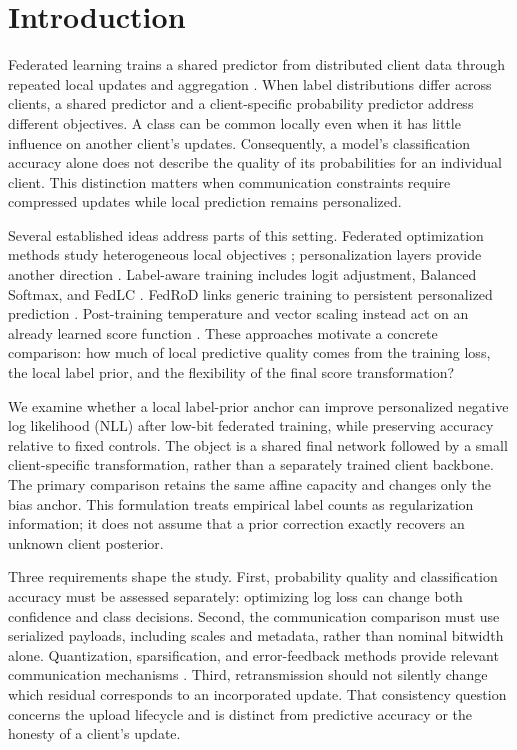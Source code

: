 \section{Introduction}

Federated learning trains a shared predictor from distributed client data through repeated local updates and aggregation \cite{mcmahan2017fedavg}. When label distributions differ across clients, a shared predictor and a client-specific probability predictor address different objectives. A class can be common locally even when it has little influence on another client's updates. Consequently, a model's classification accuracy alone does not describe the quality of its probabilities for an individual client. This distinction matters when communication constraints require compressed updates while local prediction remains personalized.

Several established ideas address parts of this setting. Federated optimization methods study heterogeneous local objectives \cite{li2020fedprox,karimireddy2020scaffold,wang2020fednova}; personalization layers provide another direction \cite{arivazhagan2019fedper}. Label-aware training includes logit adjustment, Balanced Softmax, and FedLC \cite{menon2021logitadjust,ren2020balanced,zhang2022fedlc}. FedRoD links generic training to persistent personalized prediction \cite{chen2022fedrod}. Post-training temperature and vector scaling instead act on an already learned score function \cite{guo2017calibration,alexandari2020labelshift}. These approaches motivate a concrete comparison: how much of local predictive quality comes from the training loss, the local label prior, and the flexibility of the final score transformation?

We examine whether a local label-prior anchor can improve personalized negative log likelihood (NLL) after low-bit federated training, while preserving accuracy relative to fixed controls. The object is a shared final network followed by a small client-specific transformation, rather than a separately trained client backbone. The primary comparison retains the same affine capacity and changes only the bias anchor. This formulation treats empirical label counts as regularization information; it does not assume that a prior correction exactly recovers an unknown client posterior.

Three requirements shape the study. First, probability quality and classification accuracy must be assessed separately: optimizing log loss can change both confidence and class decisions. Second, the communication comparison must use serialized payloads, including scales and metadata, rather than nominal bitwidth alone. Quantization, sparsification, and error-feedback methods provide relevant communication mechanisms \cite{alistarh2017qsgd,stich2018sparsified,karimireddy2019errorfeedback}. Third, retransmission should not silently change which residual corresponds to an incorporated update. That consistency question concerns the upload lifecycle and is distinct from predictive accuracy or the honesty of a client's update.

